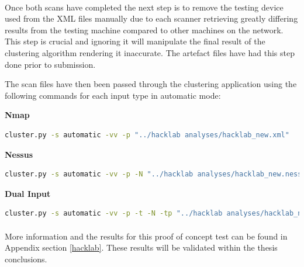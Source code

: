 \paragraph{}Once both scans have completed the next step is to remove the testing device used from the XML files manually due to each scanner retrieving greatly differing results from the testing machine compared to other machines on the network. This step is crucial and ignoring it will manipulate the final result of the clustering algorithm rendering it inaccurate. The artefact files have had this step done prior to submission.

The scan files have then been passed through the clustering application using the following commands for each input type in automatic mode:\linebreak

\textbf{Nmap}
\begin{lstlisting}[language=bash]
cluster.py -s automatic -vv -p "../hacklab analyses/hacklab_new.xml"
\end{lstlisting}

\textbf{Nessus}
\begin{lstlisting}[language=bash]
cluster.py -s automatic -vv -p -N "../hacklab analyses/hacklab_new.nessus"
\end{lstlisting}


\textbf{Dual Input}
\begin{lstlisting}[language=bash]
cluster.py -s automatic -vv -p -t -N -tp "../hacklab analyses/hacklab_new.xml" "../hacklab analyses/hacklab_new.nessus"
\end{lstlisting}

\paragraph{}More information and the results for this proof of concept test can be found in Appendix section \ref{hacklab}. These results will be validated within the thesis conclusions.


